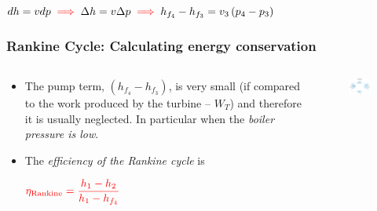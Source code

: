 \documentclass[10pt,compress]{beamer}
\begin{document}
\begin{frame}
\begin{columns}
\begin{column}[c]{0.6\linewidth}
\begin{figure}
\begin{center}
      \end{center}
     \end{figure}
    \end{column}
   \end{columns}
\begin{center}
       $dh = vdp \;\; \textcolor{red}{\Longrightarrow}\;\; \Delta h = v\Delta p \;\;\textcolor{red}{\Longrightarrow}\;\; h_{f_{4}}-h_{f_{3}}=v_{3}\left(p_{4}-p_{3}\right)$ 
\end{center}
 \normalsize
\end{frame}


\begin{frame}
 \frametitle{Rankine Cycle: Calculating energy conservation}
  \begin{columns}
   \begin{column}[c]{0.4\linewidth}
    \begin{itemize}
      \item <1-> The pump term, $\left(h_{f_{4}}-h_{f_{3}}\right)$, is very small (if compared to the work produced by the turbine -- $W_{T}$) and therefore it is usually neglected. In particular when the {\it boiler pressure is low}.
      \item <2-> The {\it efficiency of the Rankine cycle} is
\begin{center}
         $ \textcolor{red}{\eta_{\text{Rankine}}=\displaystyle\frac{h_{1}-h_{2}}{h_{1}-h_{f_{4}}}}$ 
\end{center}
     \end{itemize}
    \end{column}
    \begin{column}[c]{0.6\linewidth}
     \begin{figure}%
      \begin{center}
       \includegraphics[width=6.5cm,clip]{./Pics/Simple_Rankine_Cycle}

\end{center}
\end{figure}
\end{column}
\end{columns}
\end{frame}
\end{document}
